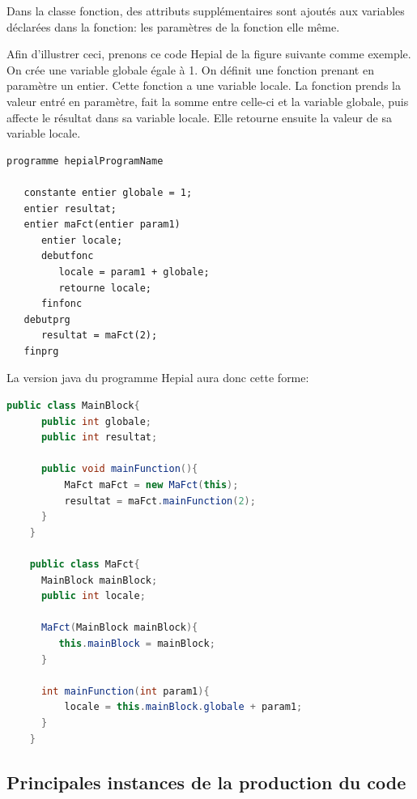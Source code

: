 \documentclass[11pt,a4paper]{article}
\begin{document}
  \par Dans la classe fonction, des attributs supplémentaires sont ajoutés aux variables déclarées dans la fonction: les paramètres de la fonction elle même. 
  
  \par Afin d'illustrer ceci, prenons ce code Hepial de la figure suivante comme exemple. On crée une variable globale égale à 1. On définit une fonction prenant en paramètre un entier. Cette fonction a une variable locale. La fonction prends la valeur entré en paramètre, fait la somme entre celle-ci et la variable globale, puis affecte le résultat dans sa variable locale. Elle retourne ensuite la valeur de sa variable locale. 
  \newpage
    \begin{lstlisting}[caption={Architecture d'une fonction et de son appel}]
   programme hepialProgramName

   constante entier globale = 1;
   entier resultat;
   entier maFct(entier param1)
      entier locale;
      debutfonc
         locale = param1 + globale;
         retourne locale;
      finfonc
   debutprg
      resultat = maFct(2);
   finprg
   \end{lstlisting} 
   
   \par La version java du programme Hepial aura donc cette forme: 
   
    \begin{lstlisting}[language=java,caption={Architecture de base d'un programme Hepial}]
    public class MainBlock{
      public int globale;
      public int resultat;
   
      public void mainFunction(){
          MaFct maFct = new MaFct(this);
          resultat = maFct.mainFunction(2);
      }
    }
    
    public class MaFct{
      MainBlock mainBlock;
      public int locale;
      
      MaFct(MainBlock mainBlock){
         this.mainBlock = mainBlock;
      }
      
      int mainFunction(int param1){
          locale = this.mainBlock.globale + param1;
      }
    }
   \end{lstlisting}    
  
  
  
  \subsection{Principales instances de la production du code} 
  
\end{document}
